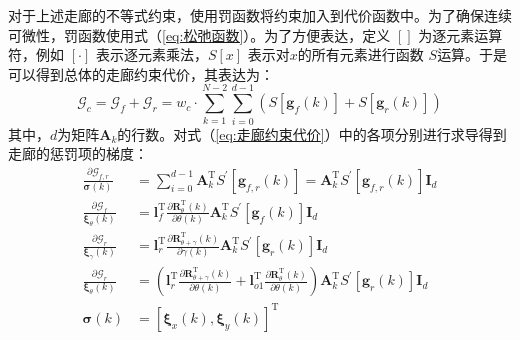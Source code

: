 \documentclass[master,academic]{ysuthesis} %
\begin{document}
		对于上述走廊的不等式约束，使用罚函数将约束加入到代价函数中。为了确保连续可微性，罚函数使用式（\ref{eq:松弛函数}）。为了方便表达，定义 \([]\) 为逐元素运算符，例如 \([\cdot]\) 表示逐元素乘法，\(S[x]\) 表示对$x$的所有元素进行函数 \(S\)运算。于是可以得到总体的走廊约束代价，其表达为：
		\begin{equation}
			\mathcal{G}_c =\mathcal{G}_{f}+\mathcal{G}_{r}=w_{c}\cdot \sum_{k=1}^{N-2}\sum_{i=0}^{d-1}(S[\bm{g}_{f}(k)] + S[\bm{g}_{r}(k)])\label{eq:走廊约束代价}
		\end{equation}
		其中，$d$为矩阵$\bm{A}_k$的行数。对式（\ref{eq:走廊约束代价}）中的各项分别进行求导得到走廊的惩罚项的梯度：
		\begin{equation}
			\begin{aligned}
				\frac{\partial \mathcal{G}_{f,r}}{\bm{\sigma} \left( k \right)}&=\sum_{i=0}^{d-1}{\bm{A}}_{k}^{\mathrm{T}}S^{'}\left[ \bm{g}_{f,r}\left( k \right) \right] =\bm{A}_{k}^{\mathrm{T}}S^{'}\left[ \bm{g}_{f,r}\left( k \right) \right] \bm{I}_d\\
				\frac{\partial \mathcal{G}_f}{\bm{\xi} _{\theta}\left( k \right)}&=\bm{l}_{f}^{\mathrm{T}}\frac{\partial \bm{R}_{\theta}^{\mathrm{T}}\left( k \right)}{\partial \theta \left( k \right)}\bm{A}_{k}^{\mathrm{T}}S^{'}\left[ \bm{g}_{f}\left( k \right) \right] \bm{I}_d\\
				\frac{\partial \mathcal{G}_r}{\bm{\xi} _{\gamma}\left( k \right)}&=\bm{l}_{r}^{\mathrm{T}}\frac{\partial \bm{R}_{\theta +\gamma}^{\mathrm{T}}\left( k \right)}{\partial \gamma \left( k \right)}\bm{A}_{k}^{\mathrm{T}}S^{'}\left[ \bm{g}_{r}\left( k \right) \right] \bm{I}_d\\
				\frac{\partial \mathcal{G}_r}{\bm{\xi} _{\theta}\left( k \right)}&=\left( \bm{l}_{r}^{\mathrm{T}}\frac{\partial \bm{R}_{\theta +\gamma}^{\mathrm{T}}\left( k \right)}{\partial \theta \left( k \right)}+\bm{l}_{o1}^{\mathrm{T}}\frac{\partial \bm{R}_{\theta}^{\mathrm{T}}\left( k \right)}{\partial \theta \left( k \right)} \right) \bm{A}_{k}^{\mathrm{T}}S^{'}\left[ \bm{g}_{r}\left( k \right) \right] \bm{I}_d\\
				\bm{\sigma} \left( k \right) &=\left[ \bm{\xi} _x\left( k \right) ,\bm{\xi} _y\left( k \right) \right] ^{\mathrm{T}}
			\end{aligned}
		\end{equation}
		
\end{document}
